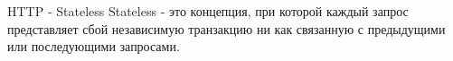 \begin{frame}{HTTP - Stateless}
Stateless - это концепция, при которой каждый запрос представляет сбой независимую транзакцию ни как связанную с предыдущими или последующими запросами.
\end{frame}
